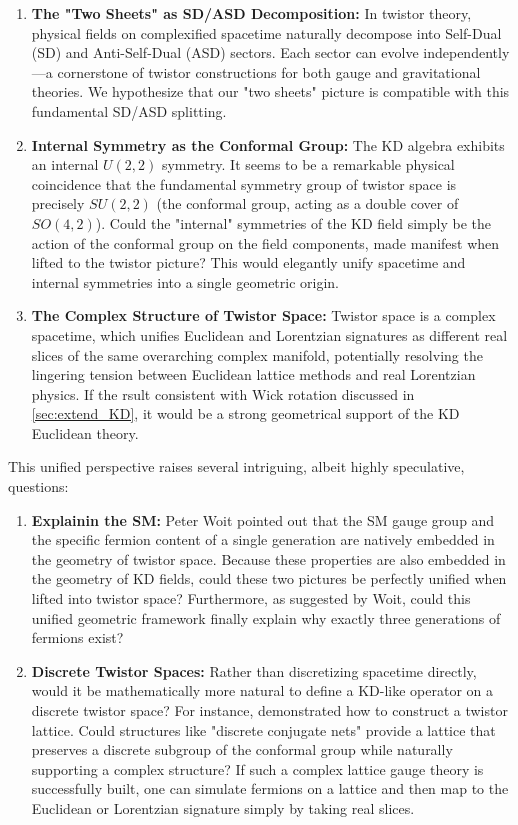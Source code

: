 \begin{enumerate}
    \item \textbf{The "Two Sheets" as SD/ASD Decomposition:} In twistor theory, physical fields on complexified spacetime naturally decompose into Self-Dual (SD) and Anti-Self-Dual (ASD) sectors. Each sector can evolve independently—a cornerstone of twistor constructions for both gauge and gravitational theories. We hypothesize that our "two sheets" picture is compatible with this fundamental SD/ASD splitting. 
    \item \textbf{Internal Symmetry as the Conformal Group:} The KD algebra exhibits an internal $U(2, 2)$ symmetry. It seems to be a remarkable physical coincidence that the fundamental symmetry group of twistor space is precisely $SU(2, 2)$ (the conformal group, acting as a double cover of $SO(4, 2)$). Could the "internal" symmetries of the KD field simply be the action of the conformal group on the field components, made manifest when lifted to the twistor picture? This would elegantly unify spacetime and internal symmetries into a single geometric origin.
    \item \textbf{The Complex Structure of Twistor Space:} Twistor space is a complex spacetime, which unifies Euclidean and Lorentzian signatures as different real slices of the same overarching complex manifold, potentially resolving the lingering tension between Euclidean lattice methods and real Lorentzian physics. If the rsult consistent with Wick rotation discussed in \cref{sec:extend_KD}, it would be a strong geometrical support of the KD Euclidean theory.
\end{enumerate}

This unified perspective raises several intriguing, albeit highly speculative, questions:
\begin{enumerate}
    \item \textbf{Explainin the SM:} Peter Woit \cite{woit2021euclideantwistorunification} pointed out that the SM gauge group and the specific fermion content of a single generation are natively embedded in the geometry of twistor space. Because these properties are also embedded in the geometry of KD fields, could these two pictures be perfectly unified when lifted into twistor space? Furthermore, as suggested by Woit, could this unified geometric framework finally explain why exactly three generations of fermions exist?
    \item \textbf{Discrete Twistor Spaces:} Rather than discretizing spacetime directly, would it be mathematically more natural to define a KD-like operator on a discrete twistor space? For instance, \citet{ShapiroGeorge2013} demonstrated how to construct a twistor lattice. Could structures like "discrete conjugate nets" provide a lattice that preserves a discrete subgroup of the conformal group while naturally supporting a complex structure? If such a complex lattice gauge theory is successfully built, one can simulate fermions on a lattice and then map to the Euclidean or Lorentzian signature simply by taking real slices.
\end{enumerate}

